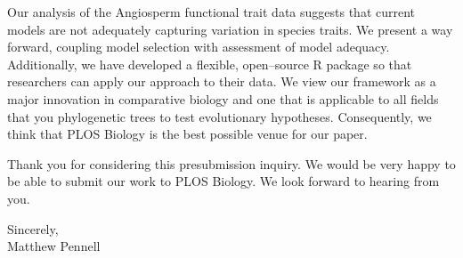 \documentclass[a4paper,12pt]{article}
\begin{document}
Our analysis of the Angiosperm functional trait data suggests that current models are not adequately capturing variation in species traits. We present a way forward, coupling model selection with assessment of model adequacy. Additionally, we have developed a flexible, open--source R package so that researchers can apply our approach to their data. We view our framework as a major innovation in comparative biology and one that is applicable to all fields that you phylogenetic trees to test evolutionary hypotheses. Consequently, we think that PLOS Biology is the best possible venue for our paper. 

Thank you for considering this presubmission inquiry. We would be very happy to be able to submit our work to PLOS Biology. We look forward to hearing from you.

\begin{flushright}
\vspace{2ex}
\hspace{.2\textwidth}Sincerely,\\
\hspace*{.3\textwidth}
Matthew Pennell
\end{flushright}



\end{document}
